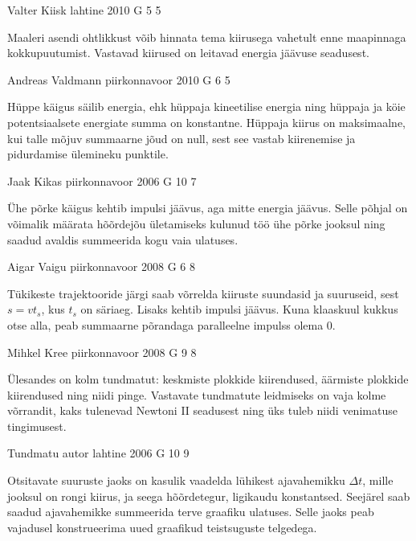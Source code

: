 \documentclass[11pt]{article}
\begin{document}
{%
{Valter Kiisk} %
{lahtine} %
{2010} %
{G 5} %
{5} %
{

\ifHint
Maaleri asendi ohtlikkust võib hinnata tema kiirusega vahetult enne maapinnaga kokkupuutumist. Vastavad kiirused on leitavad energia jäävuse seadusest.
\fi
}

{Andreas Valdmann} %
{piirkonnavoor} %
{2010} %
{G 6} %
{5} %
{

\ifHint
Hüppe käigus säilib energia, ehk hüppaja kineetilise energia ning hüppaja ja köie potentsiaalsete energiate summa on konstantne. Hüppaja kiirus on maksimaalne, kui talle mõjuv summaarne jõud on null, sest see vastab kiirenemise ja pidurdamise ülemineku punktile.
\fi
}

{Jaak Kikas} %
{piirkonnavoor} %
{2006} %
{G 10} %
{7} %
{

\ifHint
Ühe põrke käigus kehtib impulsi jäävus, aga mitte energia jäävus. Selle põhjal on võimalik määrata hõõrdejõu ületamiseks kulunud töö ühe põrke jooksul ning saadud avaldis summeerida kogu vaia ulatuses.
\fi
}

{Aigar Vaigu} %
{piirkonnavoor} %
{2008} %
{G 6} %
{8} %
{

\ifHint
Tükikeste trajektooride järgi saab võrrelda kiiruste suundasid ja suuruseid, sest $s = vt_s$, kus $t_s$ on säriaeg. Lisaks kehtib impulsi jäävus. Kuna klaaskuul kukkus otse alla, peab summaarne põrandaga paralleelne impulss olema 0.
\fi
}

{Mihkel Kree} %
{piirkonnavoor} %
{2008} %
{G 9} %
{8} %
{

\ifHint
Ülesandes on kolm tundmatut: keskmiste plokkide kiirendused, äärmiste plokkide kiirendused ning niidi pinge. Vastavate tundmatute leidmiseks on vaja kolme võrrandit, kaks tulenevad Newtoni II seadusest ning üks tuleb niidi venimatuse tingimusest.
\fi
}

{Tundmatu autor} %
{lahtine} %
{2006} %
{G 10} %
{9} %
{

\ifHint
Otsitavate suuruste jaoks on kasulik vaadelda lühikest ajavahemikku $\Delta t$, mille jooksul on rongi kiirus, ja seega hõõrdetegur, ligikaudu konstantsed. Seejärel saab saadud ajavahemikke summeerida terve graafiku ulatuses. Selle jaoks peab vajadusel konstrueerima uued graafikud teistsuguste telgedega.
\fi
}

}
\end{document}
